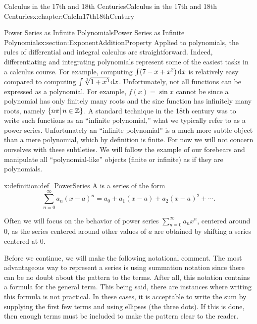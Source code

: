 \begin{chapterptx}{Calculus in the 17th and 18th Centuries}{}{Calculus in the 17th and 18th Centuries}{}{}{x:chapter:CalcIn17th18thCentury}
	\typeout{************************************************}
	\typeout{************************************************}
	\begin{sectionptx}{Power Series as Infinite Polynomials}{}{Power Series as Infinite Polynomials}{}{}{x:section:ExponentAdditionProperty}
		 Applied to polynomials, the rules of differential and integral calculus are straightforward.  Indeed, differentiating and integrating polynomials represent some of the easiest tasks in a calculus course.  For example, computing \(\int(7-x+x^2)\,{\rm d} x\) is relatively easy compared to computing \(\int\sqrt[3]{1+x^3}\,{\rm d} x\).  Unfortunately, not all functions can be expressed as a polynomial.  For example, \(f(x)=\sin x\) cannot be since a polynomial has only finitely many roots and the sine function has infinitely many roots, namely \(\{n\pi|\,n\in\mathbb {Z}\}\).  A standard technique in the 18th century was to write such functions as an ``infinite polynomial,'' what we typically refer to as a power series.  Unfortunately an ``infinite polynomial'' is a much more subtle object than a mere polynomial, which by definition is finite. For now we will not concern ourselves with these subtleties.  We will follow the example of our forebears and manipulate all ``polynomial-like'' objects (finite or infinite) as if they are polynomials.%
		\begin{definition}{}{x:definition:def_PowerSeries}%
			 A  is a series of the form%
			\begin{equation*}
				\sum_{n=0}^\infty a_n(x-a)^n=a_0+a_1(x-a)+a_2(x-a)^2+\cdots\text{.}
			\end{equation*}
			\par
			Often we will focus on the behavior of power series \(\sum_{n=0}^\infty a_nx^n\), centered around \(0\), as the series centered around other values of \(a\) are obtained by shifting a series centered at \(0\).%
		\end{definition}
		Before we continue, we will make the following notational comment. The most advantageous way to represent a series is using summation notation since there can be no doubt about the pattern to the terms. After all, this notation contains a formula for the general term. This being said, there are instances where writing this formula is not practical. In these cases, it is acceptable to write the sum by supplying the first few terms and using ellipses (the three dots). If this is done, then enough terms must be included to make the pattern clear to the reader.%

\end{sectionptx}
\end{chapterptx}
